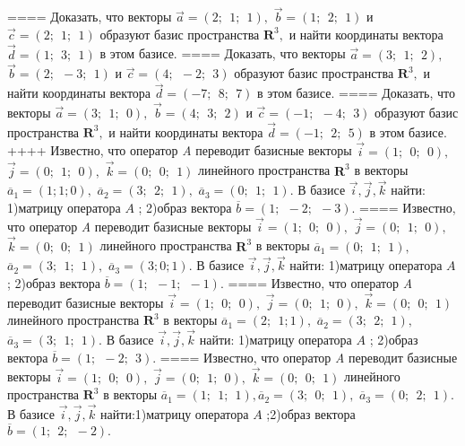 ====
Доказать, что векторы \(\overrightarrow{a} = (2;\ \ 1;\ \ 1),\) \(\overrightarrow{b} = (1;\ \ 2;\ \ 1)\) и \(\overrightarrow{c} = (2;\ \ 1;\ \ 1)\) образуют базис пространства \(\mathbf{R}^{3},\) и найти координаты вектора \(\overrightarrow{d} = (1;\ \ 3;\ \ 1)\) в этом базисе.
====
Доказать, что векторы \(\overrightarrow{a} = (3;\ \ 1;\ \ 2),\) \(\overrightarrow{b} = (2;\ \  - 3;\ \ 1)\) и \(\overrightarrow{c} = (4;\ \  - 2;\ \ 3)\) образуют базис пространства \(\mathbf{R}^{3},\) и найти координаты вектора \(\overrightarrow{d} = ( - 7;\ \ 8;\ \ 7)\) в этом базисе.
====
Доказать, что векторы \(\overrightarrow{a} = (3;\ \ 1;\ \ 0),\) \(\overrightarrow{b} = (4;\ \ 3;\ \ 2)\) и \(\overrightarrow{c} = ( - 1;\ \  - 4;\ \ 3)\) образуют базис пространства \(\mathbf{R}^{3},\) и найти координаты вектора \(\overrightarrow{d} = ( - 1;\ \ 2;\ \ 5)\) в этом базисе.
++++
Известно, что оператор \emph{A} переводит базисные векторы \(\overrightarrow{i} = (1;\ \ 0;\ \ 0),\) \(\overrightarrow{j} = (0;\ \ 1;\ \ 0),\) \(\overrightarrow{k} = (0;\ \ 0;\ \ 1)\) линейного пространства \(\mathbf{R}^{3}\) в векторы \({\overline{a}}_{1} = (1;1;0),\) \({\overline{a}}_{2} = (3;\ \ 2;\ \ 1),\) \({\overline{a}}_{3} = (0;\ \ 1;\ \ 1).\) В базисе \(\overrightarrow{i},\overrightarrow{j},\overrightarrow{k}\) найти: 1)матрицу оператора \(A\) ; 2)образ вектора \(\overline{b} = (1;\ \  - 2;\ \  - 3).\)
====
Известно, что оператор \emph{A} переводит базисные векторы \(\overrightarrow{i} = (1;\ \ 0;\ \ 0),\) \(\overrightarrow{j} = (0;\ \ 1;\ \ 0),\) \(\overrightarrow{k} = (0;\ \ 0;\ \ 1)\) линейного пространства \(\mathbf{R}^{3}\) в векторы \({\overline{a}}_{1} = (0;\ \ 1;\ \ 1),\) \({\overline{a}}_{2} = (3;\ \ 1;\ \ 1),\) \({\overline{a}}_{3} = (3;0;1).\) В базисе \(\overrightarrow{i},\overrightarrow{j},\overrightarrow{k}\) найти: 1)матрицу оператора \(A\) ; 2)образ вектора \(\overline{b} = (1;\ \  - 1;\ \  - 1).\)
====
Известно, что оператор \emph{A} переводит базисные векторы \(\overrightarrow{i} = (1;\ \ 0;\ \ 0),\) \(\overrightarrow{j} = (0;\ \ 1;\ \ 0),\) \(\overrightarrow{k} = (0;\ \ 0;\ \ 1)\) линейного пространства \(\mathbf{R}^{3}\) в векторы \({\overline{a}}_{1} = (2;\ \ 1;1),\) \({\overline{a}}_{2} = (3;\ \ 2;\ \ 1),\) \({\overline{a}}_{3} = (3;\ \ 1;\ \ 1).\) В базисе \(\overrightarrow{i},\overrightarrow{j},\overrightarrow{k}\) найти: 1)матрицу оператора \(A\) ; 2)образ вектора \(\overline{b} = (1;\ \  - 2;\ \ 3).\)
====
Известно, что оператор \emph{A} переводит базисные векторы \(\overrightarrow{i} = (1;\ \ 0;\ \ 0),\) \(\overrightarrow{j} = (0;\ \ 1;\ \ 0),\) \(\overrightarrow{k} = (0;\ \ 0;\ \ 1)\) линейного пространства \(\mathbf{R}^{3}\) в векторы \({\overline{a}}_{1} = (1;\ \ 1;\ \ 1),{\overline{a}}_{2} = (3;\ \ 0;\ \ 1),\) \({\overline{a}}_{3} = (0;\ \ 2;\ \ 1).\)В базисе \(\overrightarrow{i},\overrightarrow{j},\overrightarrow{k}\) найти:1)матрицу оператора \(A\) ;2)образ вектора \(\overline{b} = (1;\ \ 2;\ \  - 2).\)
